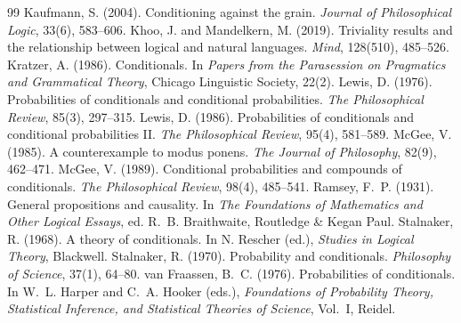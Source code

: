 \documentclass{situationist-preprint}
\begin{document}
\begin{thebibliography}{99}
 Kaufmann, S. (2004). Conditioning against the grain. \emph{Journal of Philosophical Logic}, 33(6), 583--606.
 Khoo, J. and Mandelkern, M. (2019). Triviality results and the relationship between logical and natural languages. \emph{Mind}, 128(510), 485--526.
 Kratzer, A. (1986). Conditionals. In \emph{Papers from the Parasession on Pragmatics and Grammatical Theory}, Chicago Linguistic Society, 22(2).
 Lewis, D. (1976). Probabilities of conditionals and conditional probabilities. \emph{The Philosophical Review}, 85(3), 297--315.
 Lewis, D. (1986). Probabilities of conditionals and conditional probabilities II. \emph{The Philosophical Review}, 95(4), 581--589.
 McGee, V. (1985). A counterexample to modus ponens. \emph{The Journal of Philosophy}, 82(9), 462--471.
 McGee, V. (1989). Conditional probabilities and compounds of conditionals. \emph{The Philosophical Review}, 98(4), 485--541.
 Ramsey, F.~P. (1931). General propositions and causality. In \emph{The Foundations of Mathematics and Other Logical Essays}, ed. R.~B. Braithwaite, Routledge \& Kegan Paul.
 Stalnaker, R. (1968). A theory of conditionals. In N. Rescher (ed.), \emph{Studies in Logical Theory}, Blackwell.
 Stalnaker, R. (1970). Probability and conditionals. \emph{Philosophy of Science}, 37(1), 64--80.
 van Fraassen, B.~C. (1976). Probabilities of conditionals. In W.~L. Harper and C.~A. Hooker (eds.), \emph{Foundations of Probability Theory, Statistical Inference, and Statistical Theories of Science}, Vol.~I, Reidel.
\end{thebibliography}
\end{document}
